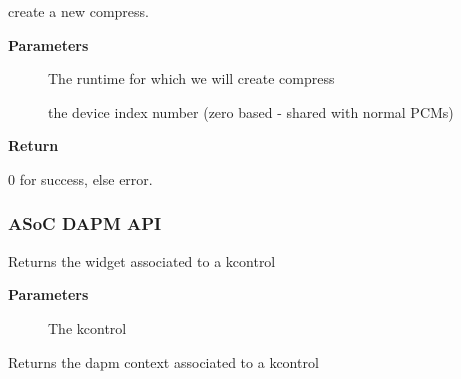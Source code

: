 \documentclass[a4paper,8pt,english]{sphinxmanual}
\begin{document}
\begin{fulllineitems}
\label{sound/kernel-api/alsa-driver-api:c.snd_soc_new_compress}
create a new compress.

\end{fulllineitems}


\textbf{Parameters}
\begin{description}
\item[{}] \leavevmode
The runtime for which we will create compress

\item[{}] \leavevmode
the device index number (zero based - shared with normal PCMs)

\end{description}

\textbf{Return}

0 for success, else error.


\subsubsection{ASoC DAPM API}
\label{sound/kernel-api/alsa-driver-api:asoc-dapm-api}

\begin{fulllineitems}
\label{sound/kernel-api/alsa-driver-api:c.snd_soc_dapm_kcontrol_widget}
Returns the widget associated to a kcontrol

\end{fulllineitems}


\textbf{Parameters}
\begin{description}
\item[{}] \leavevmode
The kcontrol

\end{description}

\begin{fulllineitems}
\label{sound/kernel-api/alsa-driver-api:c.snd_soc_dapm_kcontrol_dapm}
Returns the dapm context associated to a kcontrol

\end{fulllineitems}
\end{document}
